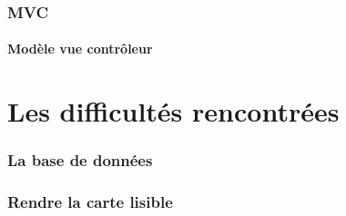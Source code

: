 \documentclass{beamer}
\begin{document}

\begin{frame}

\frametitle{MVC}
\framesubtitle{Modèle vue contrôleur}

\end{frame}


\section{Les difficultés rencontrées}

\begin{frame}
\frametitle{La base de données}

\end{frame}


\begin{frame}
\frametitle{Rendre la carte lisible}

\end{frame}


\end{document}
